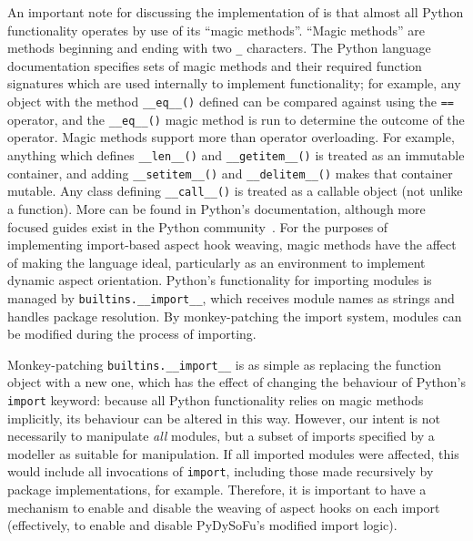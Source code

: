 An important note for discussing the implementation of \pdsf is that almost all
Python functionality operates by use of its ``magic methods''. ``Magic
methods'' are methods beginning and ending with two \lstinline{_} characters.
The Python language documentation specifies sets of magic methods and their
required function signatures which are used internally to implement
functionality; for example, any object with the method \lstinline{__eq__()}
defined can be compared against using the \lstinline{==} operator, and the
\lstinline{__eq__()} magic method is run to determine the outcome of the
operator. Magic methods support more than operator overloading. For example,
anything which defines \lstinline{__len__()} and \lstinline{__getitem__()} is
treated as an immutable container, and adding \lstinline{__setitem__()} and
\lstinline{__delitem__()} makes that container mutable. Any class defining
\lstinline{__call__()} is treated as a callable object (not unlike a function).
More can be found in Python's documentation\cite{py3docs}, although more
focused guides exist in the Python community~\cite{magicmethodguide}.
For the purposes of implementing import-based aspect hook weaving,
magic methods have the affect of making the language ideal, particularly as an environment to implement dynamic
aspect orientation. Python's functionality for importing modules is managed by
\lstinline{builtins.__import__}, which receives module names as strings and
handles package resolution. By monkey-patching the import system, modules can be
modified during the process of importing.

Monkey-patching \lstinline{builtins.__import__} is as simple as replacing the
function object with a new one, which has the effect of changing the behaviour
of Python's \lstinline{import} keyword: because all Python functionality relies
on magic methods implicitly, its behaviour can be altered in this way. However,
our intent is not necessarily to manipulate \emph{all} modules, but a subset of
imports specified by a modeller as suitable for manipulation. If all imported
modules were affected, this would include all invocations of \lstinline{import},
including those made recursively by package implementations, for example.
Therefore, it is important to have a mechanism to enable and disable the weaving
of aspect hooks on each import (effectively, to enable and disable PyDySoFu's
modified import logic). 


